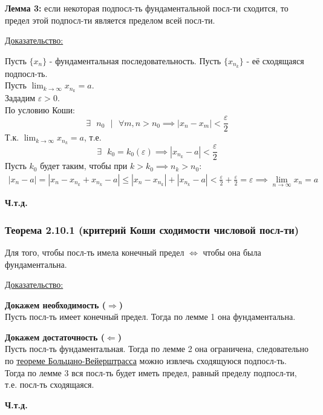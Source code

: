 \documentclass[12pt]{article}
\def\posl#1#2{\{#1_{#2}\}}
\begin{document}
    \noindent \textbf{Лемма 3:} если некоторая подпосл-ть фундаментальной посл-ти сходится, то предел этой подпосл-ти является пределом всей посл-ти.\par\noindent
    \underline{Доказательство:}
    \begin{adjustwidth}{1.5em}{1.5em}
        Пусть $\posl{x}{n}$ - фундаментальная последовательность. Пусть $\posl{x}{n_k}$ - её сходящаяся подпосл-ть.\\
        Пусть $\lim_{k\to\infty}x_{n_k} = a$.\\
        Зададим $\varepsilon > 0$.\\
        По условию Коши:
        \[ \exists \text{ } n_0 \text{ } \big| \text{ } \forall m,n > n_0 \implies |x_n - x_m| < \frac{\varepsilon}{2} \]
        Т.к. $\lim_{k\to\infty}x_{n_k} = a$, т.е.
        \[ \exists \text{ } k_0 = k_0(\varepsilon) \implies |x_{n_k} - a| < \frac{\varepsilon}{2} \]
        Пусть $k_0$ будет таким, чтобы при $k > k_0 \implies n_k > n_0$:\\
        \begin{gather*}
            |x_n - a| = |x_n - x_{n_k} + x_{n_k} - a| \le |x_n - x_{n_k}| + |x_{n_k} - a| < \frac{\varepsilon}{2} + \frac{\varepsilon}{2} = \varepsilon \implies \lim_{n\to\infty} x_n = a
        \end{gather*}
        \begin{center}
            \textbf{Ч.т.д.}
        \end{center}
    \end{adjustwidth}

    \subsubsection*{Теорема 2.10.1 (критерий Коши сходимости числовой посл-ти)}\label{th:2.10.1}
    Для того, чтобы посл-ть имела конечный предел $\Longleftrightarrow$ чтобы она была фундаментальна.\par\noindent
    \underline{Доказательство:}\par\noindent
    \begin{adjustwidth}{1.5em}{1.5em}
        \textbf{Докажем необходимость ($\Rightarrow$)}\\
        Пусть посл-ть имеет конечный предел. Тогда по лемме 1 она фундаментальна.\par\noindent
        \textbf{Докажем достаточность ($\Leftarrow$)}\\
        Пусть посл-ть фундаментальная. Тогда по лемме 2 она ограничена, следовательно по \hyperref[th:2.8.1]{теореме Больцано-Вейерштрасса} можно извлечь сходящуюся подпосл-ть.\\
        Тогда по лемме 3 вся посл-ть будет иметь предел, равный пределу подпосл-ти, т.е. посл-ть сходящаяся.
        \begin{center}
            \textbf{Ч.т.д.}
        \end{center}
    \end{adjustwidth}
\end{document}
